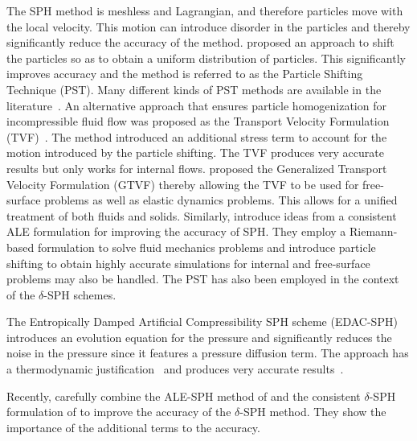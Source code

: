 The SPH method is meshless and Lagrangian, and therefore particles move with the
local velocity. This motion can introduce disorder in the particles and thereby
significantly reduce the accuracy of the method. \cite{acc_stab_xu:jcp:2009}
proposed an approach to shift the particles so as to obtain a uniform
distribution of particles. This significantly improves accuracy and the method
is referred to as the Particle Shifting Technique (PST). Many different kinds of
PST methods are available in the
literature~\citep{diff_smoothing_sph:lind:jcp:2012,fickian_smoothing_sph:skillen:cmame:2013,huang_kernel_2019,ye2019sph}.
An alternative approach that ensures particle homogenization for incompressible
fluid flow was proposed as the Transport Velocity Formulation
(TVF)~\citep{Adami2013}. The method introduced an additional stress term to
account for the motion introduced by the particle shifting. The TVF produces
very accurate results but only works for internal flows. \cite{zhang_hu_adams17}
proposed the Generalized Transport Velocity Formulation (GTVF) thereby allowing
the TVF to be used for free-surface problems as well as elastic dynamics
problems. This allows for a unified treatment of both fluids and solids.
Similarly, \cite{oger_ale_sph_2016} introduce ideas from a consistent ALE
formulation for improving the accuracy of SPH. They employ a Riemann-based
formulation to solve fluid mechanics problems and introduce particle shifting to
obtain highly accurate simulations for internal and free-surface problems may
also be handled. The PST has also been employed in the context of the
$\delta$-SPH schemes\citep{sun_consistent_2019}.


The Entropically Damped Artificial Compressibility SPH scheme
(EDAC-SPH)~\citep{edac-sph:cf:2019} introduces an evolution equation for the
pressure and significantly reduces the noise in the pressure since it features
a pressure diffusion term. The approach has a thermodynamic
justification~\citep{Clausen2013} and produces very accurate
results~\citep{edac-sph:cf:2019}.


Recently, \cite{antuono2021delta} carefully combine the ALE-SPH method of
\cite{oger_ale_sph_2016} and the consistent $\delta$-SPH formulation of
\cite{sun_consistent_2019} to improve the accuracy of the $\delta$-SPH
method. They show the importance of the additional terms to the accuracy.


